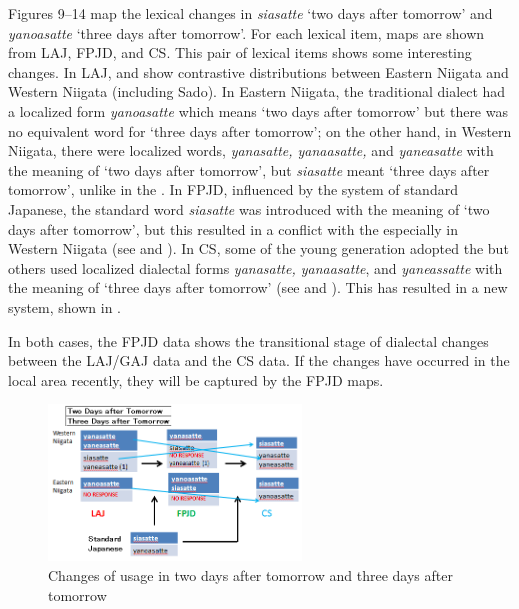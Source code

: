 \documentclass[output=paper]{LSP/langsci}
\begin{document}
Figures 9--14 map the lexical changes in \textit{siasatte} `two days after tomorrow' and \textit{yanoasatte} `three days after tomorrow'.  For each lexical item, maps are shown from \textsc{LAJ}, \textsc{FPJD}, and \textsc{CS}. This pair of lexical items shows some interesting changes.  In \textsc{LAJ},  and  show contrastive distributions between Eastern Niigata and Western Niigata (including Sado).  In Eastern Niigata, the traditional dialect had a localized form \textit{yanoasatte} which means `two days after tomorrow' but there was no equivalent word for `three days after tomorrow'; on the other hand, in Western Niigata, there were localized words, \textit{yanasatte, yanaasatte,} and \textit{yaneasatte} with the meaning of `two days after tomorrow', but \textit{siasatte} meant `three days after tomorrow', unlike in the . In \textsc{FPJD}, influenced by the system of standard Japanese, the standard word \textit{siasatte} was introduced with the meaning of `two days after tomorrow', but this resulted in a conflict with the  especially in Western Niigata (see  and ).  In \textsc{CS}, some of the young generation adopted the  but others used localized dialectal forms \textit{yanasatte, yanaasatte}, and \textit{yaneassatte} with the meaning of `three days after tomorrow' (see  and ). This has resulted in a new system, shown in .

In both cases, the \textsc{FPJD} data shows the transitional stage of dialectal changes between the \textsc{LAJ}/\textsc{GAJ} data and the \textsc{CS} data. If the changes have occurred in the local area recently, they will be captured by the \textsc{FPJD} maps.

\begin{figure}
\includegraphics[width=0.6\textwidth]{illustrations/fuku2_fig7}
\caption{Changes of usage in {\textquotedbl}two days after tomorrow{\textquotedbl} and {\textquotedbl}three days after tomorrow{\textquotedbl}}
\label{fig:fuku:7}
\end{figure}
\end{document}
